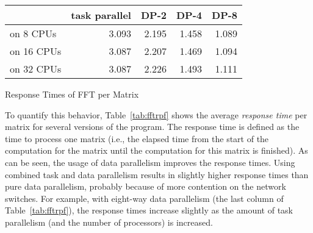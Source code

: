 \documentclass{acmtrans2e}
\begin{document}

\begin{acmtable}{10cm}
\centering
\begin{tabular*}{10cm}{@{\extracolsep\fill}l|r r r r}
          & task parallel & DP-2 & DP-4 & DP-8 \\
\hline
on 8 CPUs & 3.093 & 2.195 & 1.458 & 1.089 \\
on 16 CPUs & 3.087 & 2.207 & 1.469 & 1.094 \\
on 32 CPUs & 3.087 & 2.226 & 1.493 & 1.111 \\
\end{tabular*}
\caption{Response Times of FFT per Matrix}
\label{tab:fftrpf}
\end{acmtable}

To quantify this behavior, Table~\ref{tab:fftrpf} shows the
average \emph{response time} per matrix for several versions of the program.
The response time is defined as the time to process one matrix (i.e., the
elapsed time from the start of the computation for the matrix until
the computation for this matrix is finished).
As can be seen, the usage of data parallelism
improves the response times.  Using combined task and data parallelism
results in slightly higher response times than pure data parallelism,
probably because of more contention on the network switches.
For example, with eight-way data parallelism (the last column of
Table~\ref{tab:fftrpf}), the response times increase slightly as
the amount of task parallelism (and the number of processors) is increased.
\end{document}

